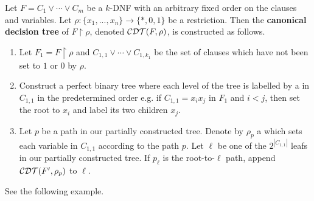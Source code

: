 \documentclass[11pt]{article}
\begin{document}
	\begin{definition}
		\label{def:canonicaldecisiontree} 
		Let $F = C_1 \lor \cdots \lor C_m$ be a $k$-DNF with an arbitrary fixed order on the clauses and variables. Let $\rho: \{x_1, ..., x_n\} \rightarrow \{*, 0, 1\}$ be a restriction. Then the \textbf{canonical decision tree} of $F \upharpoonright \rho$, denoted $\mathcal{CDT}(F, \rho)$, is constructed as follows. 
		\begin{enumerate}
			\item Let $F_1 = F \upharpoonright \rho$ and $C_{1,1} \lor \cdots \lor C_{1,k_1}$ be the set of clauses which have not been set to $1$ or $0$ by $\rho$. 
			\item Construct a perfect binary tree where each level of the tree is labelled by a in $C_{1,1}$ in the predetermined order e.g. if $C_{1,1} = x_ix_j$ in $F_1$ and $i < j$, then set the root to $x_i$ and label its two children $x_j$. 
			\item Let $p$ be a path in our partially constructed tree. Denote by $\rho_{p}$ a which sets each variable in $C_{1,1}$ according to the path $p$. Let $\ell$ be one of the $2^{|C_{1,1}|}$ leafs in our partially constructed tree. If $p_{\ell}$ is the root-to-$\ell$ path, append $\mathcal{CDT}(F', \rho_{p})$ to $\ell$. 
		\end{enumerate}
		See the following example. 
	\end{definition}
	
\end{document}
